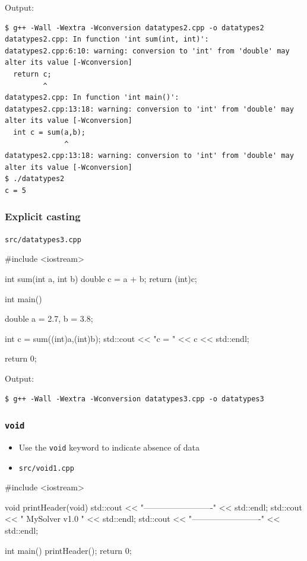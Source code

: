\documentclass[12pt,letterpaper,twoside]{article}
\begin{document}
Output:

\begin{verbatim}
$ g++ -Wall -Wextra -Wconversion datatypes2.cpp -o datatypes2
datatypes2.cpp: In function 'int sum(int, int)':
datatypes2.cpp:6:10: warning: conversion to 'int' from 'double' may alter its value [-Wconversion]
  return c;
         ^
datatypes2.cpp: In function 'int main()':
datatypes2.cpp:13:18: warning: conversion to 'int' from 'double' may alter its value [-Wconversion]
  int c = sum(a,b);
              ^
datatypes2.cpp:13:18: warning: conversion to 'int' from 'double' may alter its value [-Wconversion]
$ ./datatypes2
c = 5
\end{verbatim}

\subsubsection{Explicit casting}
\texttt{src/datatypes3.cpp}

\begin{cpp}
#include <iostream>

int sum(int a, int b) {
  double c = a + b;
  return (int)c;
}

int main() {
  double a = 2.7, b = 3.8;

  int c = sum((int)a,(int)b);
  std::cout << "c = " << c << std::endl;

  return 0;
}
\end{cpp}

Output:

\begin{verbatim}
$ g++ -Wall -Wextra -Wconversion datatypes3.cpp -o datatypes3
\end{verbatim}

\subsubsection{\texorpdfstring{\texttt{void}}{void}}
\begin{itemize}
\item
  Use the \texttt{void} keyword to indicate absence of data
\item
  \texttt{src/void1.cpp}
\end{itemize}

\begin{cpp}
#include <iostream>

void printHeader(void) {
  std::cout << "-------------------------" << std::endl;
  std::cout << "      MySolver v1.0      " << std::endl;
  std::cout << "-------------------------" << std::endl;
}

int main() {
  printHeader();
  return 0;
}
\end{cpp}
\end{document}
